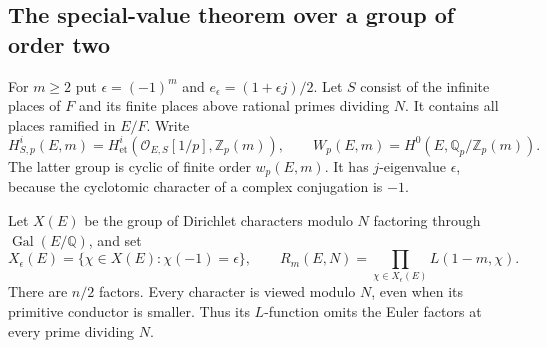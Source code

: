\subsection{The special-value theorem over a group of order two}

For $m\ge2$ put $\epsilon=(-1)^m$ and
$e_\epsilon=(1+\epsilon j)/2$.
Let $S$ consist of the infinite places of $F$ and its
finite places above rational primes dividing $N$.
It contains all places ramified in $E/F$.  Write
\[
 H^i_{S,p}(E,m)=
 H^i_{\mathrm{et}}(\mathcal O_{E,S}[1/p],\mathbb Z_p(m)),
 \qquad
 W_p(E,m)=H^0(E,\mathbb Q_p/\mathbb Z_p(m)).
 \tag{MS4}
\]
The latter group is cyclic of finite order $w_p(E,m)$.
It has $j$-eigenvalue $\epsilon$, because the cyclotomic
character of a complex conjugation is $-1$.

Let $X(E)$ be the group of Dirichlet characters modulo $N$
factoring through $\operatorname{Gal}(E/\mathbb Q)$, and set
\[
 X_\epsilon(E)=\{\chi\in X(E):\chi(-1)=\epsilon\},
 \qquad
 R_m(E,N)=\prod_{\chi\in X_\epsilon(E)} L(1-m,\chi).
 \tag{MS5}
\]
There are $n/2$ factors.  Every character is viewed modulo
$N$, even when its primitive conductor is smaller.
Thus its $L$-function omits the Euler factors at every
prime dividing $N$.


